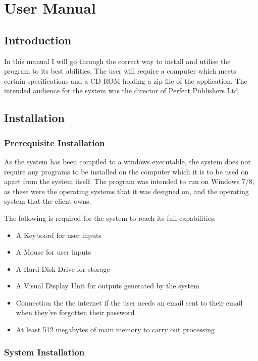 \chapter{User Manual}

\section{Introduction}

In this manual I will go through the correct way to install and utilise the program to its best abilities. The user will require a computer which meets certain specifications and a CD-ROM holding a zip file of the application. The intended audience for the system was the director of Perfect Publishers Ltd.

\section{Installation}

\subsection{Prerequisite Installation}

As the system has been compiled to a windows executable, the system does not require any programs to be installed on the computer which it is to be used on apart from the system itself. The program was intended to run on Windows 7/8, as these were the operating systems that it was designed on, and the operating system that the client owns.

The following is required for the system to reach its full capabilities:

\begin{itemize}
    \item A Keyboard for user inputs
    \item A Mouse for user inputs
    \item A Hard Disk Drive for storage
    \item A Visual Display Unit for outputs generated by the system
    \item Connection the the internet if the user needs an email sent to their email when they've forgotten their password
    \item At least 512 megabytes of main memory to carry out processing
\end{itemize}


\subsection{System Installation}

